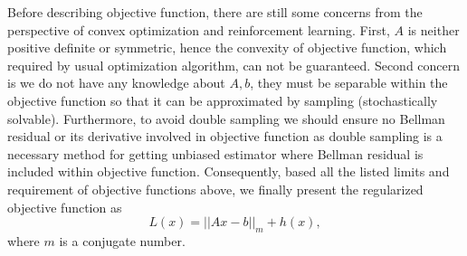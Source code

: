 \documentclass[conference]{IEEEtran}
\begin{document}
Before describing objective function, there are still some concerns from the perspective of convex optimization and reinforcement learning. First, $A$ is neither positive definite or symmetric, hence the convexity of objective function, which required by usual optimization algorithm, can not be guaranteed. Second concern is we do not have any knowledge about $A, b$, they must be separable within the objective function so that it can be approximated by sampling (stochastically solvable). Furthermore, to avoid double sampling we should ensure no Bellman residual or its derivative involved in objective function as double sampling is a necessary method for getting unbiased estimator where Bellman residual is included within objective function. Consequently, based all the listed limits and requirement of objective functions above, we finally present the regularized objective function as
\begin{equation}
	L(x)=||Ax-b||_m+h(x),
\end{equation}
where $m$ is a conjugate number.
\end{document}
